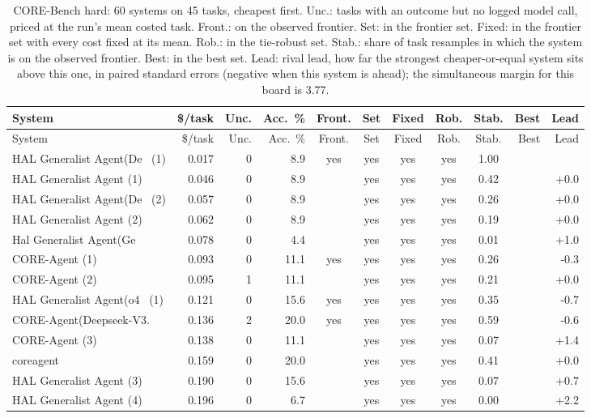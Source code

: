 {\begin{longtable}{lrrrcccccrr}
\caption{CORE-Bench hard: 60 systems on 45 tasks, cheapest first. Unc.: tasks with an outcome but no logged model call, priced at the run's mean costed task. Front.: on the observed frontier. Set: in the frontier set. Fixed: in the frontier set with every cost fixed at its mean. Rob.: in the tie-robust set. Stab.: share of task resamples in which the system is on the observed frontier. Best: in the best set. Lead: rival lead, how far the strongest cheaper-or-equal system sits above this one, in paired standard errors (negative when this system is ahead); the simultaneous margin for this board is 3.77.}\label{tab:supp-hal_corebench_hard}\\
\toprule
System & \$/task & Unc. & Acc.\ \% & Front. & Set & Fixed & Rob. & Stab. & Best & Lead \\
\midrule
\endfirsthead
\toprule
System & \$/task & Unc. & Acc.\ \% & Front. & Set & Fixed & Rob. & Stab. & Best & Lead \\
\midrule
\endhead
\bottomrule
\endfoot
HAL Generalist Agent(De~ (1) & 0.017 & 0 & 8.9 & yes & yes & yes & yes & 1.00 &  &  \\
HAL Generalist Agent (1) & 0.046 & 0 & 8.9 &  & yes & yes & yes & 0.42 &  & +0.0 \\
HAL Generalist Agent(De~ (2) & 0.057 & 0 & 8.9 &  & yes & yes & yes & 0.26 &  & +0.0 \\
HAL Generalist Agent (2) & 0.062 & 0 & 8.9 &  & yes & yes & yes & 0.19 &  & +0.0 \\
Hal Generalist Agent(Ge~ & 0.078 & 0 & 4.4 &  & yes & yes & yes & 0.01 &  & +1.0 \\
CORE-Agent (1) & 0.093 & 0 & 11.1 & yes & yes & yes & yes & 0.26 &  & -0.3 \\
CORE-Agent (2) & 0.095 & 1 & 11.1 &  & yes & yes & yes & 0.21 &  & +0.0 \\
HAL Generalist Agent(o4~ (1) & 0.121 & 0 & 15.6 & yes & yes & yes & yes & 0.35 &  & -0.7 \\
CORE-Agent(Deepseek-V3.~ & 0.136 & 2 & 20.0 & yes & yes & yes & yes & 0.59 &  & -0.6 \\
CORE-Agent (3) & 0.138 & 0 & 11.1 &  & yes & yes & yes & 0.07 &  & +1.4 \\
coreagent & 0.159 & 0 & 20.0 &  & yes & yes & yes & 0.41 &  & +0.0 \\
HAL Generalist Agent (3) & 0.190 & 0 & 15.6 &  & yes & yes & yes & 0.07 &  & +0.7 \\
HAL Generalist Agent (4) & 0.196 & 0 & 6.7 &  & yes & yes & yes & 0.00 &  & +2.2 \\

\end{longtable}}
